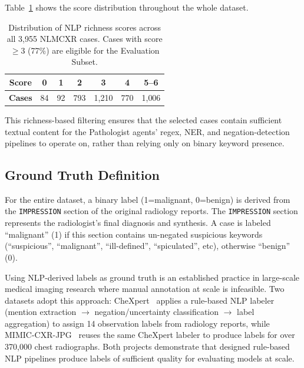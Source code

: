 \documentclass[12pt]{article}
\begin{document}
Table~\ref{tab:richness-dist} shows the score distribution throughout the whole dataset.

\begin{table}[ht]
\centering
\begin{tabular}{ccccccc}
\toprule
\textbf{Score} & 0 & 1 & 2 & 3 & 4 & 5--6 \\
\midrule
\textbf{Cases} & 84 & 92 & 793 & 1{,}210 & 770 & 1{,}006 \\
\bottomrule
\end{tabular}
\caption{Distribution of NLP richness scores across all 3{,}955 NLMCXR cases. Cases with score $\geq 3$ (77\%) are eligible for the Evaluation Subset.}
\label{tab:richness-dist}
\end{table}

This richness-based filtering ensures that the selected cases contain sufficient textual content for the Pathologist agents' regex, NER, and negation-detection pipelines to operate on, rather than relying only on binary keyword presence.

\subsection{Ground Truth Definition}
\label{subsec:groundtruth}

For the entire dataset, a binary label (1=malignant, 0=benign) is derived from the \texttt{IMPRESSION} section of the original radiology reports. The \texttt{IMPRESSION} section represents the radiologist's final diagnosis and synthesis. A case is labeled ``malignant'' (1) if this section contains un-negated suspicious keywords (``suspicious'', ``malignant'', ``ill-defined'', ``spiculated'', etc), otherwise ``benign'' (0).

Using NLP-derived labels as ground truth is an established practice in large-scale medical imaging research where manual annotation at scale is infeasible. Two datasets adopt this approach: CheXpert~\cite{irvin2019chexpert} applies a rule-based NLP labeler (mention extraction $\rightarrow$ negation/uncertainty classification $\rightarrow$ label aggregation) to assign 14 observation labels from radiology reports, while MIMIC-CXR-JPG~\cite{johnson2019mimiccxr} reuses the same CheXpert labeler to produce labels for over 370{,}000 chest radiographs. Both projects demonstrate that designed rule-based NLP pipelines produce labels of sufficient quality for evaluating models at scale.
\end{document}
